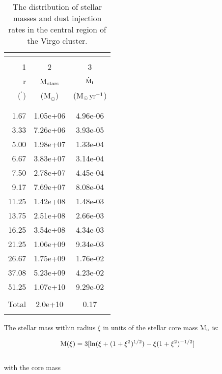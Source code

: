 \documentclass[]{aa}
\begin{document}
\begin{table}[htb]
\caption[] {The distribution of stellar masses and dust injection 
 rates in the central region  of the Virgo cluster.}
\begin{tabular}{rcc}
\multicolumn{3}{l}{{\bf}}\\
\hline\hline
& &  \\
1      & 2          & 3  \\
r & M$_{\rm stars}$ &  ${\dot{{\rm M}}}_{\rm i}$ \\
($^{\prime}$) & (M$_{\odot}$) & (M$_{\odot}\, {\rm yr}^{-1}$)\\
& & \\
\hline\hline
& & \\
  1.67 &  1.05e+06 & 4.96e-06\\	
  3.33 &  7.26e+06 & 3.93e-05\\	
  5.00 &  1.98e+07 & 1.33e-04\\	
  6.67 &  3.83e+07 & 3.14e-04\\	
  7.50 &  2.78e+07 & 4.45e-04\\	
  9.17 &  7.69e+07 & 8.08e-04\\	
 11.25 &  1.42e+08 & 1.48e-03\\	
 13.75 &  2.51e+08 & 2.66e-03\\	
 16.25 &  3.54e+08 & 4.34e-03\\	
 21.25 &  1.06e+09 & 9.34e-03\\	
 26.67 &  1.75e+09 & 1.76e-02\\	
 37.08 &  5.23e+09 & 4.23e-02\\	
 51.25 &  1.07e+10 & 9.29e-02\\
\hline
&&\\
Total & 2.0e+10 & 0.17 \\	 
& & \\
\hline
\end{tabular}
\end{table}

The stellar mass within radius ${\xi}$ in units of the stellar core mass
M$_{\rm c}$
 is:

\begin{eqnarray}
{\rm M}(\xi)=3[\ln(\xi+(1+{\xi}^2)^{1/2})-\xi(1+{\xi}^2)^{-1/2}]
\end{eqnarray}\\
with the core mass
\end{document}
